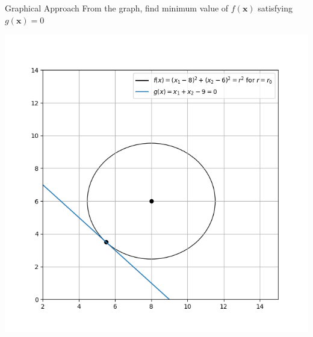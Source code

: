\documentclass[10pt]{beamer}
\begin{document}
{
\begin{frame}{Graphical Approach}
From the graph, find minimum value of $f(\textbf{x})$ satisfying $g(\textbf{x}) = 0$
	\graphicspath{ {./images/} }
    \includegraphics[scale=0.45,center]{2D_2}
\end{frame}
}
\end{document}

